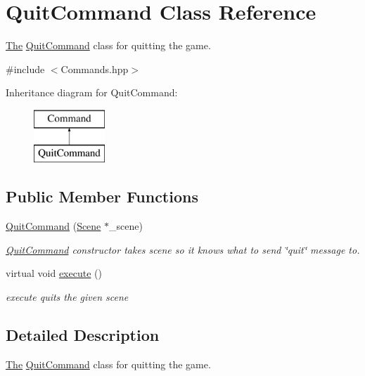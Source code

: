 \hypertarget{class_quit_command}{}\section{Quit\+Command Class Reference}
\label{class_quit_command}


\hyperlink{namespace_the}{The} \hyperlink{class_quit_command}{Quit\+Command} class for quitting the game.  




{\ttfamily \#include $<$Commands.\+hpp$>$}

Inheritance diagram for Quit\+Command\+:\begin{figure}[H]
\begin{center}
\leavevmode
\includegraphics[height=2.000000cm]{class_quit_command}
\end{center}
\end{figure}
\subsection*{Public Member Functions}
\begin{DoxyCompactItemize}
\item 
\hyperlink{class_quit_command_aed8d101db7e8a638ba782f3996dee5e0}{Quit\+Command} (\hyperlink{class_scene}{Scene} $\ast$\+\_\+scene)
\begin{DoxyCompactList}\small\item\em \hyperlink{class_quit_command}{Quit\+Command} constructor takes scene so it knows what to send \char`\"{}quit\char`\"{} message to. \end{DoxyCompactList}\item 
\hypertarget{class_quit_command_a19a299d82562bfba6df200c8840d8ef6}{}virtual void \hyperlink{class_quit_command_a19a299d82562bfba6df200c8840d8ef6}{execute} ()\label{class_quit_command_a19a299d82562bfba6df200c8840d8ef6}

\begin{DoxyCompactList}\small\item\em execute quits the given scene \end{DoxyCompactList}\end{DoxyCompactItemize}


\subsection{Detailed Description}
\hyperlink{namespace_the}{The} \hyperlink{class_quit_command}{Quit\+Command} class for quitting the game. 

